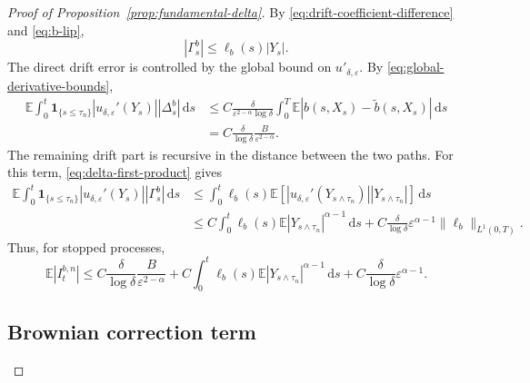 \documentclass[11pt]{article}
\newcommand{\E}{\mathbb{E}}
\newcommand{\1}{\mathbf{1}}
\newcommand{\dd}{\,\mathrm{d}}
\newcommand{\wt}{\tilde}
\newcommand{\eps}{\varepsilon}
\begin{document}
\begin{proof}[Proof of Proposition~\ref{prop:fundamental-delta}]
By \eqref{eq:drift-coefficient-difference} and \eqref{eq:b-lip},
\[
  |\Gamma_s^b|\le \ell_b(s)|Y_s|.
\]
The direct drift error is controlled by the global bound on $u'_{\delta,\eps}$. By \eqref{eq:global-derivative-bounds},
\begin{align*}
\E\int_0^t \1_{\{s\le\tau_n\}} |u_{\delta,\eps}'(Y_s)||\Delta_s^b|\dd s
&\le C\frac{\delta}{\eps^{2-\alpha}\log\delta}
\int_0^T\E |b(s,X_s)-\wt b(s,X_s)|\dd s\\
&=C\frac{\delta}{\log\delta}\frac{B}{\eps^{2-\alpha}}.
\end{align*}
The remaining drift part is recursive in the distance between the two paths. For this term, \eqref{eq:delta-first-product} gives
\begin{align*}
\E\int_0^t \1_{\{s\le\tau_n\}} |u_{\delta,\eps}'(Y_s)||\Gamma_s^b|\dd s
&\le \int_0^t \ell_b(s)\E\left[|u_{\delta,\eps}'(Y_{s\wedge\tau_n})||Y_{s\wedge\tau_n}|\right]\dd s\\
&\le C\int_0^t \ell_b(s)\E |Y_{s\wedge\tau_n}|^{\alpha-1}\dd s
+C\frac{\delta}{\log\delta}\eps^{\alpha-1}\|\ell_b\|_{L^1(0,T)}.
\end{align*}
Thus, for stopped processes,
\begin{equation}\label{eq:drift-estimate}
\E |I_{t}^{b,n}|
\le C\frac{\delta}{\log\delta}\frac{B}{\eps^{2-\alpha}}
+C\int_0^t \ell_b(s)\E|Y_{s\wedge\tau_n}|^{\alpha-1}\dd s
+C\frac{\delta}{\log\delta}\eps^{\alpha-1}.
\end{equation}

\subsection{Brownian correction term}
\label{subsec:brownian-term}


\end{proof}
\end{document}
